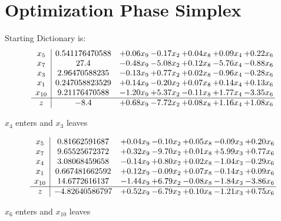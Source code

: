 \documentclass[9pt]{article}
\begin{document}
\section{Optimization Phase Simplex}
Starting Dictionary is:
\[\begin{array}{c| c c@{\hskip 2pt} c@{\hskip 2pt} c@{\hskip 2pt} c@{\hskip 2pt} c@{\hskip 2pt} }
 x_{5}   &  0.541176470588 & +  0.06 x_{9} & -0.17 x_{2} & +  0.04 x_{8} & +  0.09 x_{4} & +  0.22 x_{6}\\
 x_{7}   &  27.4 & -0.48 x_{9} & -5.08 x_{2} & +  0.12 x_{8} & -5.76 x_{4} & -0.88 x_{6}\\
 x_{3}   &  2.96470588235 & -0.13 x_{9} & +  0.77 x_{2} & +  0.02 x_{8} & -0.96 x_{4} & -0.28 x_{6}\\
 x_{1}   &  0.247058823529 & +  0.14 x_{9} & -0.20 x_{2} & +  0.07 x_{8} & +  0.14 x_{4} & +  0.13 x_{6}\\
 x_{10}   &  9.21176470588 & -1.20 x_{9} & +  5.37 x_{2} & -0.11 x_{8} & +  1.77 x_{4} & -3.35 x_{6}\\
\hline
z    &  -8.4 & +  0.68 x_{9} & -7.72 x_{2} & +  0.08 x_{8} & +  1.16 x_{4} & +  1.08 x_{6}\\
\end{array}\]


 $ x_{4} $ enters and $ x_{3} $ leaves 

 \[\begin{array}{c| c c@{\hskip 2pt} c@{\hskip 2pt} c@{\hskip 2pt} c@{\hskip 2pt} c@{\hskip 2pt} }
 x_{5}   &  0.81662591687 & +  0.04 x_{9} & -0.10 x_{2} & +  0.05 x_{8} & -0.09 x_{3} & +  0.20 x_{6}\\
 x_{7}   &  9.65525672372 & +  0.32 x_{9} & -9.70 x_{2} & +  0.01 x_{8} & +  5.99 x_{3} & +  0.77 x_{6}\\
 x_{4}   &  3.08068459658 & -0.14 x_{9} & +  0.80 x_{2} & +  0.02 x_{8} & -1.04 x_{3} & -0.29 x_{6}\\
 x_{1}   &  0.667481662592 & +  0.12 x_{9} & -0.09 x_{2} & +  0.07 x_{8} & -0.14 x_{3} & +  0.09 x_{6}\\
 x_{10}   &  14.6772616137 & -1.44 x_{9} & +  6.79 x_{2} & -0.08 x_{8} & -1.84 x_{3} & -3.86 x_{6}\\
\hline
z    &  -4.82640586797 & +  0.52 x_{9} & -6.79 x_{2} & +  0.10 x_{8} & -1.21 x_{3} & +  0.75 x_{6}\\
\end{array}\]


 $ x_{6} $ enters and $ x_{10} $ leaves 
\end{document}
